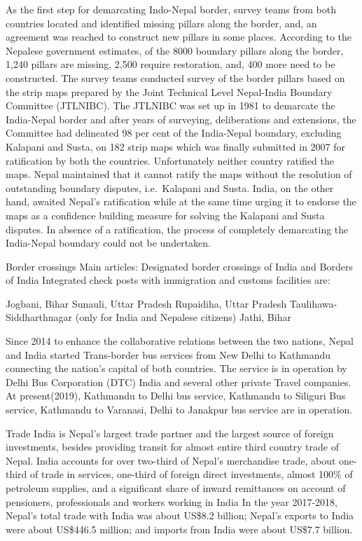 \documentclass[
  openany]{book}
\begin{document}
As the first step for demarcating Indo-Nepal border, survey teams from both countries located and identified missing pillars along the border, and, an agreement was reached to construct new pillars in some places. According to the Nepalese government estimates, of the 8000 boundary pillars along the border, 1,240 pillars are missing, 2,500 require restoration, and, 400 more need to be constructed. The survey teams conducted survey of the border pillars based on the strip maps prepared by the Joint Technical Level Nepal-India Boundary Committee (JTLNIBC). The JTLNIBC was set up in 1981 to demarcate the India-Nepal border and after years of surveying, deliberations and extensions, the Committee had delineated 98 per cent of the India-Nepal boundary, excluding Kalapani and Susta, on 182 strip maps which was finally submitted in 2007 for ratification by both the countries. Unfortunately neither country ratified the maps. Nepal maintained that it cannot ratify the maps without the resolution of outstanding boundary disputes, i.e.~Kalapani and Susta. India, on the other hand, awaited Nepal's ratification while at the same time urging it to endorse the maps as a confidence building measure for solving the Kalapani and Susta disputes. In absence of a ratification, the process of completely demarcating the India-Nepal boundary could not be undertaken.

Border crossings
Main articles: Designated border crossings of India and Borders of India
Integrated check posts with immigration and customs facilities are:

Jogbani, Bihar
Sunauli, Uttar Pradesh
Rupaidiha, Uttar Pradesh
Taulihawa-Siddharthnagar (only for India and Nepalese citizens)
Jathi, Bihar

Since 2014 to enhance the collaborative relations between the two nations, Nepal and India started Trans-border bus services from New Delhi to Kathmandu connecting the nation's capital of both countries. The service is in operation by Delhi Bus Corporation (DTC) India and several other private Travel companies. At present(2019), Kathmandu to Delhi bus service, Kathmandu to Siliguri Bus service, Kathmandu to Varanasi, Delhi to Janakpur bus service are in operation.

Trade
India is Nepal's largest trade partner and the largest source of foreign investments, besides providing transit for almost entire third country trade of Nepal. India accounts for over two-third of Nepal's merchandise trade, about one-third of trade in services, one-third of foreign direct investments, almost 100\% of petroleum supplies, and a significant share of inward remittances on account of pensioners, professionals and workers working in India In the year 2017-2018, Nepal's total trade with India was about US\$8.2 billion; Nepal's exports to India were about US\$446.5 million; and imports from India were about US\$7.7 billion.
\end{document}
